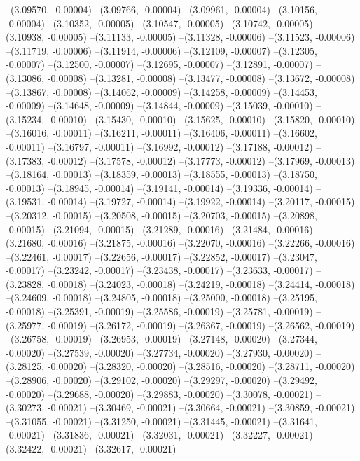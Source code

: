 --(3.09570, -0.00004)
--(3.09766, -0.00004)
--(3.09961, -0.00004)
--(3.10156, -0.00004)
--(3.10352, -0.00005)
--(3.10547, -0.00005)
--(3.10742, -0.00005)
--(3.10938, -0.00005)
--(3.11133, -0.00005)
--(3.11328, -0.00006)
--(3.11523, -0.00006)
--(3.11719, -0.00006)
--(3.11914, -0.00006)
--(3.12109, -0.00007)
--(3.12305, -0.00007)
--(3.12500, -0.00007)
--(3.12695, -0.00007)
--(3.12891, -0.00007)
--(3.13086, -0.00008)
--(3.13281, -0.00008)
--(3.13477, -0.00008)
--(3.13672, -0.00008)
--(3.13867, -0.00008)
--(3.14062, -0.00009)
--(3.14258, -0.00009)
--(3.14453, -0.00009)
--(3.14648, -0.00009)
--(3.14844, -0.00009)
--(3.15039, -0.00010)
--(3.15234, -0.00010)
--(3.15430, -0.00010)
--(3.15625, -0.00010)
--(3.15820, -0.00010)
--(3.16016, -0.00011)
--(3.16211, -0.00011)
--(3.16406, -0.00011)
--(3.16602, -0.00011)
--(3.16797, -0.00011)
--(3.16992, -0.00012)
--(3.17188, -0.00012)
--(3.17383, -0.00012)
--(3.17578, -0.00012)
--(3.17773, -0.00012)
--(3.17969, -0.00013)
--(3.18164, -0.00013)
--(3.18359, -0.00013)
--(3.18555, -0.00013)
--(3.18750, -0.00013)
--(3.18945, -0.00014)
--(3.19141, -0.00014)
--(3.19336, -0.00014)
--(3.19531, -0.00014)
--(3.19727, -0.00014)
--(3.19922, -0.00014)
--(3.20117, -0.00015)
--(3.20312, -0.00015)
--(3.20508, -0.00015)
--(3.20703, -0.00015)
--(3.20898, -0.00015)
--(3.21094, -0.00015)
--(3.21289, -0.00016)
--(3.21484, -0.00016)
--(3.21680, -0.00016)
--(3.21875, -0.00016)
--(3.22070, -0.00016)
--(3.22266, -0.00016)
--(3.22461, -0.00017)
--(3.22656, -0.00017)
--(3.22852, -0.00017)
--(3.23047, -0.00017)
--(3.23242, -0.00017)
--(3.23438, -0.00017)
--(3.23633, -0.00017)
--(3.23828, -0.00018)
--(3.24023, -0.00018)
--(3.24219, -0.00018)
--(3.24414, -0.00018)
--(3.24609, -0.00018)
--(3.24805, -0.00018)
--(3.25000, -0.00018)
--(3.25195, -0.00018)
--(3.25391, -0.00019)
--(3.25586, -0.00019)
--(3.25781, -0.00019)
--(3.25977, -0.00019)
--(3.26172, -0.00019)
--(3.26367, -0.00019)
--(3.26562, -0.00019)
--(3.26758, -0.00019)
--(3.26953, -0.00019)
--(3.27148, -0.00020)
--(3.27344, -0.00020)
--(3.27539, -0.00020)
--(3.27734, -0.00020)
--(3.27930, -0.00020)
--(3.28125, -0.00020)
--(3.28320, -0.00020)
--(3.28516, -0.00020)
--(3.28711, -0.00020)
--(3.28906, -0.00020)
--(3.29102, -0.00020)
--(3.29297, -0.00020)
--(3.29492, -0.00020)
--(3.29688, -0.00020)
--(3.29883, -0.00020)
--(3.30078, -0.00021)
--(3.30273, -0.00021)
--(3.30469, -0.00021)
--(3.30664, -0.00021)
--(3.30859, -0.00021)
--(3.31055, -0.00021)
--(3.31250, -0.00021)
--(3.31445, -0.00021)
--(3.31641, -0.00021)
--(3.31836, -0.00021)
--(3.32031, -0.00021)
--(3.32227, -0.00021)
--(3.32422, -0.00021)
--(3.32617, -0.00021)
